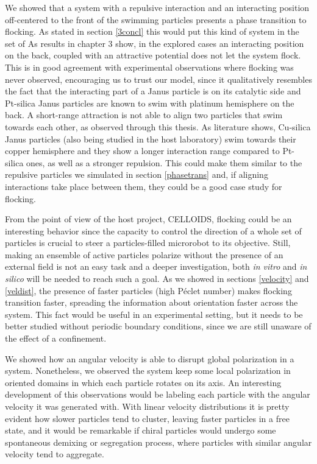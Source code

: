 \documentclass[../../master_thesis_np.tex]{subfiles}
\begin{document}
We showed that a system with a repulsive interaction and an interacting position off-centered to the front of the swimming particles presents a phase transition to flocking.
As stated in section \ref{3concl} this would put this kind of system in the set of 
As results in chapter 3 show, in the explored cases an interacting position on the back, coupled with an attractive potential does not let the system flock.
This is in good agreement with experimental observations where flocking was never observed, encouraging us to trust our model, since it qualitatively resembles the fact that the interacting part of a Janus particle is on its catalytic side and Pt-silica Janus particles are known to swim with platinum hemisphere on the back.
A short-range attraction is not able to align two particles that swim towards each other, as observed through this thesis.
As literature \cite{sharan_pair_2023} shows, Cu-silica Janus particles (also being studied in the host laboratory) swim towards their copper hemisphere and they show a longer interaction range compared to Pt-silica ones, as well as a stronger repulsion.
This could make them similar to the repulsive particles we simulated in section \ref{phasetrans} and, if aligning interactions take place between them, they could be a good case study for flocking.

From the point of view of the host project, CELLOIDS, flocking could be an interesting behavior since the capacity to control the direction of a whole set of particles is crucial to steer a particles-filled microrobot to its objective.
Still, making an ensemble of active particles polarize without the presence of an external field is not an easy task and a deeper investigation, both \emph{in vitro} and \emph{in silico} will be needed to reach such a goal.
As we showed in sections \ref{velocity} and \ref{veldist}, the presence of faster particles (high Péclet number) makes flocking transition faster, spreading the information about orientation faster across the system.
This fact would be useful in an experimental setting, but it needs to be better studied without periodic boundary conditions, since we are still unaware of the effect of a confinement.

We showed how an angular velocity is able to disrupt global polarization in a system. 
Nonetheless, we observed the system keep some local polarization in oriented domains in which each particle rotates on its axis.
An interesting development of this observations would be labeling each particle with the angular velocity it was generated with.
With linear velocity distributions it is pretty evident how slower particles tend to cluster, leaving faster particles in a free state, and it would be remarkable if chiral particles would undergo some spontaneous demixing or segregation process, where particles with similar angular velocity tend to aggregate.
\end{document}
